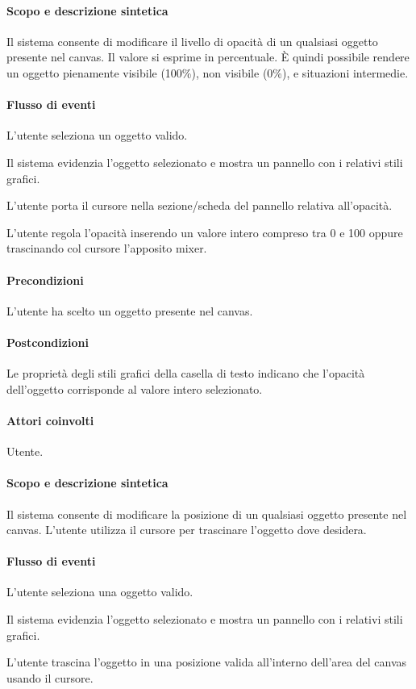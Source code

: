 \paragraph{Scopo e descrizione sintetica}  Il sistema consente di modificare il livello di opacit\` a di un qualsiasi oggetto presente nel canvas. Il valore si esprime in percentuale.   \` E quindi possibile rendere un oggetto pienamente visibile (100\%), non visibile (0\%), e situazioni intermedie.
\paragraph{Flusso di eventi}
\begin{elenconumerato}[\textbf{}]{\subsubsecindent}
\item L'utente seleziona un oggetto valido.
\item Il sistema evidenzia l'oggetto selezionato e mostra un pannello con i relativi stili grafici.
\item L'utente porta  il cursore nella sezione/scheda del pannello relativa all'opacit\` a.
\item L'utente regola l'opacit\` a inserendo un valore intero compreso tra 0 e 100 oppure trascinando col cursore l'apposito mixer.
\end{elenconumerato}
\paragraph{Precondizioni} L'utente ha scelto un oggetto presente nel canvas.
\paragraph{Postcondizioni} Le propriet\` a degli stili grafici della casella di testo indicano che l'opacit\` a dell'oggetto corrisponde al valore intero selezionato.

\paragraph{Attori coinvolti} Utente.
\paragraph{Scopo e descrizione sintetica} Il sistema consente di modificare la posizione di un qualsiasi oggetto presente nel canvas. L'utente utilizza il cursore per trascinare l'oggetto dove desidera.
\paragraph{Flusso di eventi}
\begin{elenconumerato}[\textbf{}]{\subsubsecindent}
\item L'utente seleziona una oggetto valido.
\item Il sistema evidenzia l'oggetto selezionato e mostra un pannello con i relativi stili grafici.
\item L'utente trascina l'oggetto in una posizione valida all'interno dell'area del canvas usando il cursore.
\end{elenconumerato}
